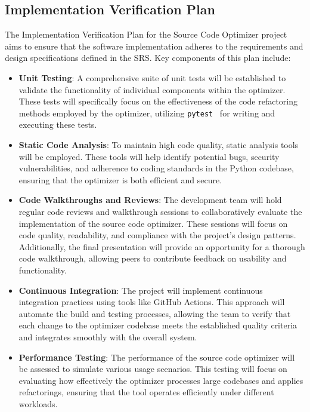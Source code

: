 \documentclass[12pt, titlepage]{article}
\begin{document}
\subsection{Implementation Verification Plan}

The Implementation Verification Plan for the Source Code Optimizer project aims to ensure that the software implementation adheres to the requirements and design specifications defined in the SRS. Key components of this plan include:

\begin{itemize}
    \item \textbf{Unit Testing}: A comprehensive suite of unit tests will be established to validate the functionality of individual components within the optimizer. These tests will specifically focus on the effectiveness of the code refactoring methods employed by the optimizer, utilizing \texttt{pytest}~\cite{pytest} for writing and executing these tests.
    
    \item \textbf{Static Code Analysis}: To maintain high code quality, static analysis tools will be employed. These tools will help identify potential bugs, security vulnerabilities, and adherence to coding standards in the Python codebase, ensuring that the optimizer is both efficient and secure.
    
    \item \textbf{Code Walkthroughs and Reviews}: The development team will hold regular code reviews and walkthrough sessions to collaboratively evaluate the implementation of the source code optimizer. These sessions will focus on code quality, readability, and compliance with the project’s design patterns. Additionally, the final presentation will provide an opportunity for a thorough code walkthrough, allowing peers to contribute feedback on usability and functionality.
    
    \item \textbf{Continuous Integration}: The project will implement continuous integration practices using tools like GitHub Actions. This approach will automate the build and testing processes, allowing the team to verify that each change to the optimizer codebase meets the established quality criteria and integrates smoothly with the overall system.
    
    \item \textbf{Performance Testing}: The performance of the source code optimizer will be assessed to simulate various usage scenarios. This testing will focus on evaluating how effectively the optimizer processes large codebases and applies refactorings, ensuring that the tool operates efficiently under different workloads.
\end{itemize}
\end{document}
